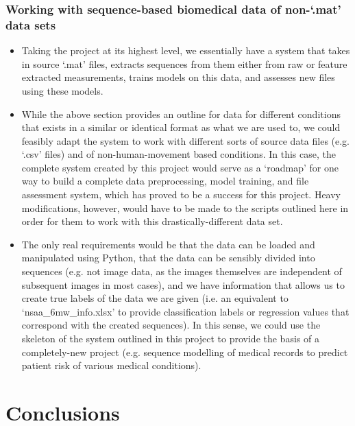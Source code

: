 \documentclass[12pt,twoside]{report}
\begin{document}
\subsection{Working with sequence-based biomedical data of non-‘.mat’ data sets}
\begin{itemize}
	\item Taking the project at its highest level, we essentially have a system that takes in source ‘.mat’ files, extracts sequences from them either from raw or feature extracted measurements, trains models on this data, and assesses new files using these models.
	\item While the above section provides an outline for data for different conditions that exists in a similar or identical format as what we are used to, we could feasibly adapt the system to work with different sorts of source data files (e.g. ‘.csv’ files) and of non-human-movement based conditions. In this case, the complete system created by this project would serve as a ‘roadmap’ for one way to build a complete data preprocessing, model training, and file assessment system, which has proved to be a success for this project. Heavy modifications, however, would have to be made to the scripts outlined here in order for them to work with this drastically-different data set.
	\item The only real requirements would be that the data can be loaded and manipulated using Python, that the data can be sensibly divided into sequences (e.g. not image data, as the images themselves are independent of subsequent images in most cases), and we have information that allows us to create true labels of the data we are given (i.e. an equivalent to ‘nsaa\_6mw\_info.xlsx’ to provide classification labels or regression values that correspond with the created sequences). In this sense, we could use the skeleton of the system outlined in this project to provide the basis of a completely-new project (e.g. sequence modelling of medical records to predict patient risk of various medical conditions).
\end{itemize}











\chapter{Conclusions\\~\\}
\end{document}
